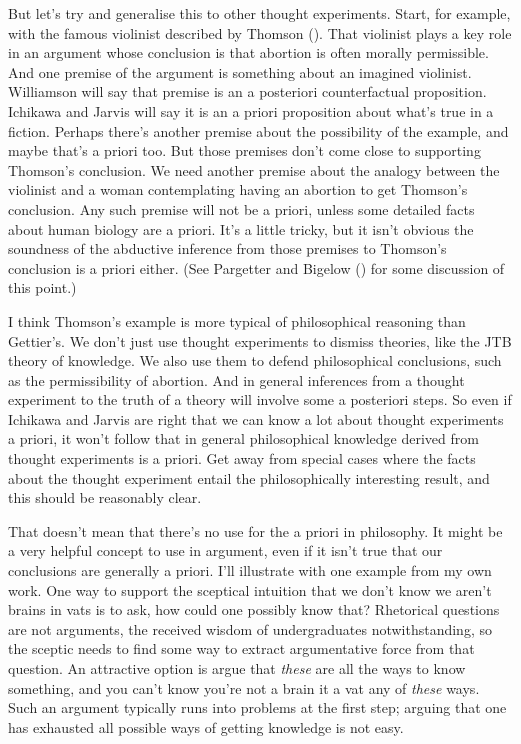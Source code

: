 \documentclass[
  11pt,
  letterpaper,
  DIV=11,
  numbers=noendperiod,
  twoside]{scrartcl}
\begin{document}
But let's try and generalise this to other thought experiments. Start,
for example, with the famous violinist described by Thomson
(). That violinist plays a key role in
an argument whose conclusion is that abortion is often morally
permissible. And one premise of the argument is something about an
imagined violinist. Williamson will say that premise is an a posteriori
counterfactual proposition. Ichikawa and Jarvis will say it is an a
priori proposition about what's true in a fiction. Perhaps there's
another premise about the possibility of the example, and maybe that's a
priori too. But those premises don't come close to supporting Thomson's
conclusion. We need another premise about the analogy between the
violinist and a woman contemplating having an abortion to get Thomson's
conclusion. Any such premise will not be a priori, unless some detailed
facts about human biology are a priori. It's a little tricky, but it
isn't obvious the soundness of the abductive inference from those
premises to Thomson's conclusion is a priori either. (See Pargetter and
Bigelow () for some discussion
of this point.)

I think Thomson's example is more typical of philosophical reasoning
than Gettier's. We don't just use thought experiments to dismiss
theories, like the JTB theory of knowledge. We also use them to defend
philosophical conclusions, such as the permissibility of abortion. And
in general inferences from a thought experiment to the truth of a theory
will involve some a posteriori steps. So even if Ichikawa and Jarvis are
right that we can know a lot about thought experiments a priori, it
won't follow that in general philosophical knowledge derived from
thought experiments is a priori. Get away from special cases where the
facts about the thought experiment entail the philosophically
interesting result, and this should be reasonably clear.

That doesn't mean that there's no use for the a priori in philosophy. It
might be a very helpful concept to use in argument, even if it isn't
true that our conclusions are generally a priori. I'll illustrate with
one example from my own work. One way to support the sceptical intuition
that we don't know we aren't brains in vats is to ask, how could one
possibly know that? Rhetorical questions are not arguments, the received
wisdom of undergraduates notwithstanding, so the sceptic needs to find
some way to extract argumentative force from that question. An
attractive option is argue that \emph{these} are all the ways to know
something, and you can't know you're not a brain it a vat any of
\emph{these} ways. Such an argument typically runs into problems at the
first step; arguing that one has exhausted all possible ways of getting
knowledge is not easy.
\end{document}
